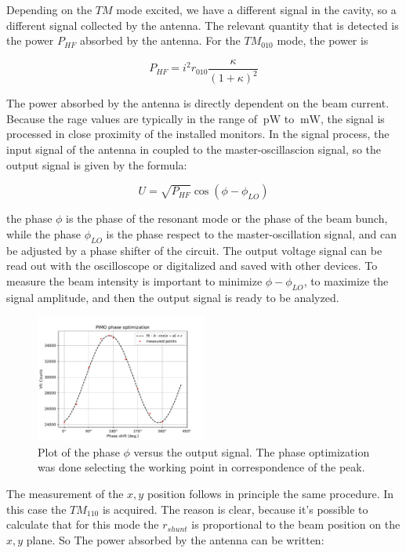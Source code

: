 Depending on the $TM$ mode excited, we have a different signal in the cavity, so a different signal collected by the antenna. The relevant quantity that is detected is the power $P_{HF}$ absorbed by the antenna. For the $TM_{010}$ mode, the power is 

\begin{equation}
P_{HF} = i^{2} r_{010} \frac{\kappa}{(1 + \kappa)^{2}}
\end{equation}

The power absorbed by the antenna is directly dependent on the beam current. Because the rage values are typically in the range of $\SI{}{\pico \watt}$ to $\SI{}{\milli \watt }$, the signal is processed in close proximity of the installed monitors. In the signal process, the input signal of the antenna in coupled to the master-oscillascion signal, so the output signal is given by the formula:

\begin{equation}
U = \sqrt{P_{HF}} \cos(\phi - \phi_{LO})
\end{equation}

the phase $\phi$ is the phase of the resonant mode or the phase of the beam bunch, while the phase $\phi_{LO}$ is the phase respect to the master-oscillation signal, and can be adjusted by a phase shifter of the circuit. The output voltage signal can be read out with the oscilloscope or digitalized and saved with other devices. To measure the beam intensity is important to minimize $\phi - \phi_{LO}$, to maximize the signal amplitude, and then the output signal is ready to be analyzed.

\begin{figure}[hbtp]
\centering
\includegraphics[width = 0.5\textwidth]{ExperimentalSetup/PIMOphase.pdf}
\caption{Plot of the phase $\phi$ versus the output signal. The phase optimization was done selecting the working point in correspondence of the peak.}
\end{figure}


The measurement of the $x,y$ position follows in principle the same procedure. In this case the $TM_{110}$ is acquired. The reason is clear, because it's possible to calculate that for this mode the $r_{shunt}$ is proportional to the beam position on the $x,y$ plane. So The power absorbed by the antenna can be written:

